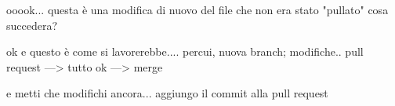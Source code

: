 \usepackage{pdfcomment}


    ooook... questa è una modifica di nuovo del file che non era stato "pullato" cosa succedera?

    ok e questo è come si lavorerebbe....
    percui, nuova branch;
    modifiche..
    pull request
    ---> tutto ok ---> merge

    e metti che modifichi ancora... 
    aggiungo il commit alla pull request
